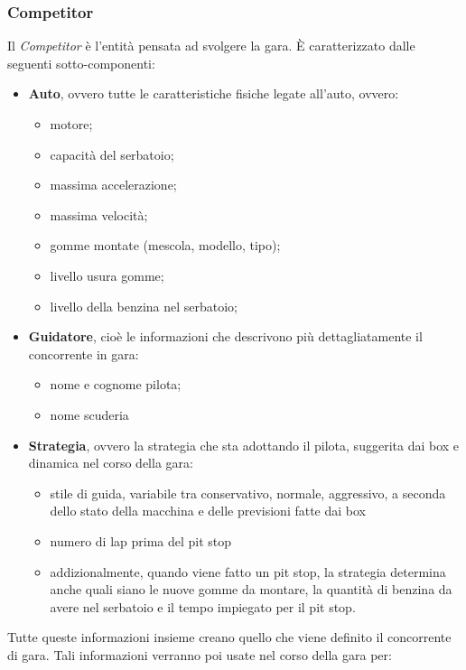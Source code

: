 \subsubsection{Competitor}
\label{competitor}
Il \emph{Competitor} \`{e} l'entit\`{a} pensata ad svolgere la gara. \`{E} caratterizzato dalle seguenti sotto-componenti:
\begin{itemize}
\item \textbf{Auto}, ovvero tutte le caratteristiche fisiche legate all'auto, ovvero:
	\begin{itemize}
		\item motore;
		\item capacit\`{a} del serbatoio;
		\item massima accelerazione;
		\item massima velocit\`{a};
		\item gomme montate (mescola, modello, tipo);
		\item livello usura gomme;
		\item livello della benzina nel serbatoio;
	\end{itemize}
\item \textbf{Guidatore}, cio\`{e} le informazioni che descrivono pi\`{u} dettagliatamente il concorrente in gara:
	\begin{itemize}
		\item nome e cognome pilota;
		\item nome scuderia
	\end{itemize}
\item \textbf{Strategia}, ovvero la strategia che sta adottando il pilota, suggerita dai box e dinamica nel corso della gara:
	\begin{itemize}
		\item stile di guida, variabile tra conservativo, normale, aggressivo, a seconda dello stato della macchina e delle
			previsioni fatte dai box
		\item numero di lap prima del pit stop
		\item addizionalmente, quando viene fatto un pit stop, la strategia determina anche quali siano le nuove gomme da montare,
		 	la quantit\`{a} di benzina da avere nel serbatoio e il tempo impiegato per il pit stop.
	\end{itemize}
\end{itemize}
Tutte queste informazioni insieme creano quello che viene definito il concorrente di gara. 
Tali informazioni verranno poi usate nel corso della gara per:
